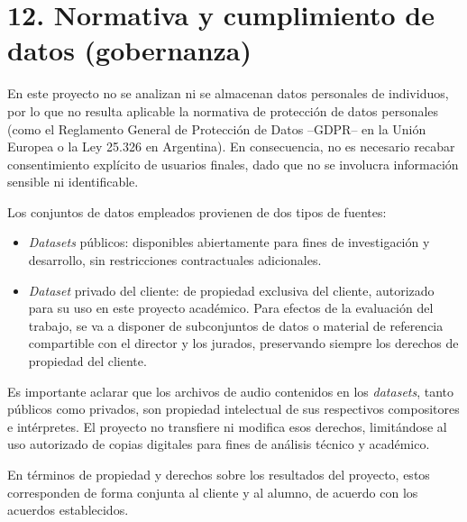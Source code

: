 \documentclass[
11pt, %
]{charter}
\begin{document}
\newpage
\section{12. Normativa y cumplimiento de datos (gobernanza)}

En este proyecto no se analizan ni se almacenan datos personales de individuos, por lo que no resulta aplicable la normativa de protección de datos personales (como el Reglamento General de Protección de Datos --GDPR-- en la Unión Europea o la Ley 25.326 en Argentina). En consecuencia, no es necesario recabar consentimiento explícito de usuarios finales, dado que no se involucra información sensible ni identificable.

Los conjuntos de datos empleados provienen de dos tipos de fuentes:
\begin{itemize}
  \item \textit{Datasets} públicos: disponibles abiertamente para fines de investigación y desarrollo, sin restricciones contractuales adicionales.
  \item \textit{Dataset} privado del cliente: de propiedad exclusiva del cliente, autorizado para su uso en este proyecto académico. Para efectos de la evaluación del trabajo, se va a disponer de subconjuntos de datos o material de referencia compartible con el director y los jurados, preservando siempre los derechos de propiedad del cliente.
\end{itemize}

Es importante aclarar que los archivos de audio contenidos en los \textit{datasets}, tanto públicos como privados, son propiedad intelectual de sus respectivos compositores e intérpretes. El proyecto no transfiere ni modifica esos derechos, limitándose al uso autorizado de copias digitales para fines de análisis técnico y académico.

En términos de propiedad y derechos sobre los resultados del proyecto, estos corresponden de forma conjunta al cliente y al alumno, de acuerdo con los acuerdos establecidos. 
\end{document}
